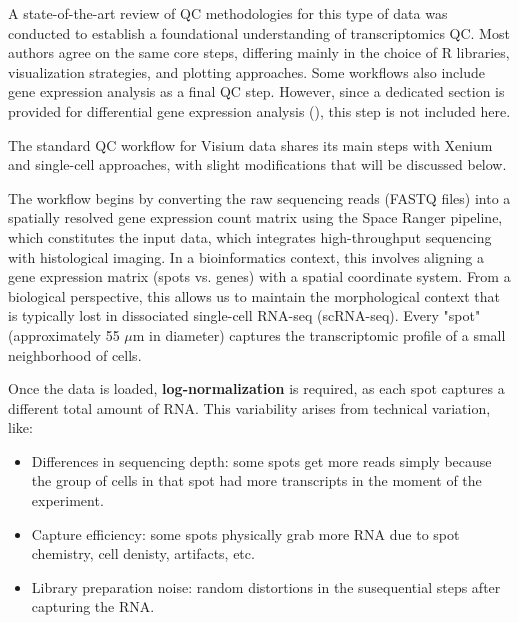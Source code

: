 A state-of-the-art review of QC methodologies for this type of data was conducted to establish a foundational understanding of transcriptomics QC. Most authors agree on the same core steps, differing mainly in the choice of R libraries, visualization strategies, and plotting approaches. Some workflows also include gene expression analysis as a final QC step\cite{MitocondrialExample}. However, since a dedicated section is provided for differential gene expression analysis (), this step is not included here.

The standard QC workflow for Visium data \cite{SeuratStandardWorflow} shares its main steps with Xenium and single-cell approaches, with slight modifications that will be discussed below.

The workflow begins by converting the raw sequencing reads (FASTQ files) into a spatially resolved gene expression count matrix using the Space Ranger pipeline, which constitutes the input data, which integrates high-throughput sequencing with histological imaging. In a bioinformatics context, this involves aligning a gene expression matrix (spots vs. genes) with a spatial coordinate system. From a biological perspective, this allows us to maintain the morphological context that is typically lost in dissociated single-cell RNA-seq (scRNA-seq). Every "spot" (approximately 55 $\mu$m in diameter) captures the transcriptomic profile of a small neighborhood of cells.

Once the data is loaded, \textbf{log-normalization} is required\cite{SeuratVisium}, as each spot captures a different total amount of RNA. This variability arises from technical variation, like:

\begin{itemize}
    \item Differences in sequencing depth: some spots get more reads simply because the group of cells in that spot had more transcripts in the moment of the experiment.
    \item Capture efficiency: some spots physically grab more RNA due to spot chemistry, cell denisty, artifacts, etc.
    \item Library preparation noise: random distortions in the susequential steps after capturing the RNA.
\end{itemize}

